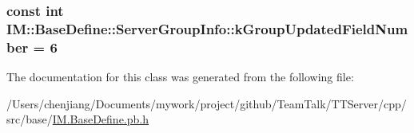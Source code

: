 \subsubsection[{k\+Group\+Updated\+Field\+Number}]{\setlength{\rightskip}{0pt plus 5cm}const int I\+M\+::\+Base\+Define\+::\+Server\+Group\+Info\+::k\+Group\+Updated\+Field\+Number = 6\hspace{0.3cm}{\ttfamily [static]}}\label{class_i_m_1_1_base_define_1_1_server_group_info_a06c82fd70e4af6b87625fdb55475b47d}


The documentation for this class was generated from the following file\+:\begin{DoxyCompactItemize}
\item 
/\+Users/chenjiang/\+Documents/mywork/project/github/\+Team\+Talk/\+T\+T\+Server/cpp/src/base/\hyperlink{_i_m_8_base_define_8pb_8h}{I\+M.\+Base\+Define.\+pb.\+h}\end{DoxyCompactItemize}
